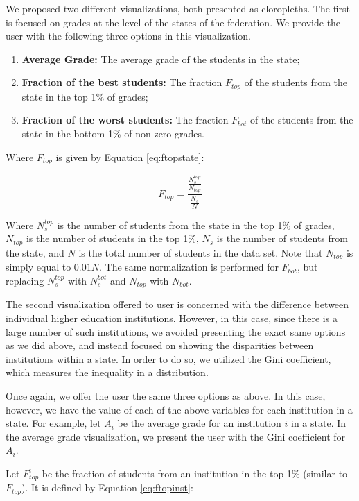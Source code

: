 \documentclass{vgtc}                          %
\begin{document}
We proposed two different visualizations, both presented as cloropleths. The first is focused on grades at the level of the states of the federation. We provide the user with the following three options in this visualization.

\begin{enumerate}
	\item{\textbf{Average Grade:} The average grade of the students in the state;}
	\item{\textbf{Fraction of the best students:} The fraction $F_{top}$ of the students from the state in the top 1\% of grades;}
	\item{\textbf{Fraction of the worst students:} The fraction $F_{bot}$ of the students from the state in the bottom 1\% of non-zero grades.}
\end{enumerate}

Where $F_{top}$ is given by Equation \ref{eq:ftopstate}:

\begin{equation}\label{eq:ftopstate}
F_{top} = \frac{\frac{N_{s}^{top}}{N_{top}}}{\frac{N_{s}}{N}}
\end{equation}

Where $N_{s}^{top}$ is the number of students from the state in the top 1\% of grades, $N_{top}$ is the number of students in the top 1\%, $N_{s}$ is the number of students from the state, and $N$ is the total number of students in the data set. Note that $N_{top}$ is simply equal to $0.01 N$. The same normalization is performed for $F_{bot}$, but replacing $N_{s}^{top}$ with $N_{s}^{bot}$ and $N_{top}$ with $N_{bot}$.

The second visualization offered to user is concerned with the difference between individual higher education institutions. However, in this case, since there is a large number of such institutions, we avoided presenting the exact same options as we did above, and instead focused on showing the disparities between institutions within a state. In order to do so, we utilized the Gini coefficient, which measures the inequality in a distribution. 

Once again, we offer the user the same three options as above. In this case, however, we have the value of each of the above variables for each institution in a state. For example, let $A_{i}$ be the average grade for an institution $i$ in a state. In the average grade visualization, we present the user with the Gini coefficient for $A_{i}$.

Let $F_{top}^{i}$ be the fraction of students from an institution in the top 1\% (similar to $F_{top}$). It is defined by Equation \ref{eq:ftopinst}:
\end{document}
